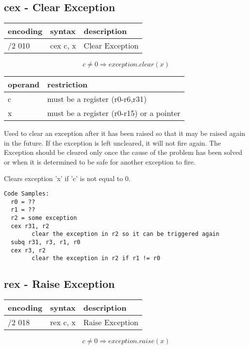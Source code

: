\documentclass[letterpaper,10pt,openright,twoside,onecolumn]{book}
\begin{document}
\subsection{cex - Clear Exception}
  \begin{tabular}{|l|l|l|}
   \hline
    encoding & syntax & description \\
   \hline
    /2 010 & cex c, x & Clear Exception \\
   \hline
  \end{tabular}

  \begin{displaymath} c \neq 0 \Rightarrow exception.clear(x)\end{displaymath}

  \flushleft
  \begin{tabular}{|l|l|}
   \hline
    operand & restriction \\
   \hline
    c & must be a register (r0-r6,r31) \\
    x & must be a register (r0-r15) or a pointer \\
   \hline
  \end{tabular}

  Used to clear an exception after it has been raised so that it may be raised again
  in the future.  If the exception is left uncleared, it will not fire again.  The
  Exception should be cleared only once the cause of the problem has been solved or
  when it is determined to be safe for another exception to fire.

  Clears exception 'x' if 'c' is not equal to 0.

  \begin{verbatim}
Code Samples:
  r0 = ??
  r1 = ??
  r2 = some exception
  cex r31, r2
        clear the exception in r2 so it can be triggered again
  subq r31, r3, r1, r0
  cex r3, r2
        clear the exception in r2 if r1 != r0
  \end{verbatim}
\newpage\subsection{rex - Raise Exception}
  \begin{tabular}{|l|l|l|}
   \hline
    encoding & syntax & description \\
   \hline
    /2 018 & rex c, x & Raise Exception \\
   \hline
  \end{tabular}

  \begin{displaymath} c \neq 0 \Rightarrow exception.raise(x)\end{displaymath}
\end{document}
